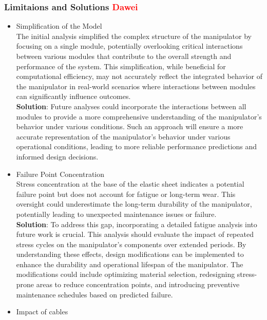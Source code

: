 \subsubsection{Limitaions and Solutions \textcolor{red}{Dawei}}
\begin{itemize}
    \item Simplification of the Model \\
    The initial analysis simplified the complex structure of the manipulator by focusing on a single module, 
    potentially overlooking critical interactions between various modules that contribute to the overall 
    strength and performance of the system. This simplification, while beneficial for computational efficiency, 
    may not accurately reflect the integrated behavior of the manipulator in real-world scenarios where interactions 
    between modules can significantly influence outcomes. \\
    \textbf{Solution}: Future analyses could incorporate the interactions between all modules to provide a more 
    comprehensive understanding of the manipulator's behavior under various conditions. Such an approach will 
    ensure a more accurate representation of the manipulator's behavior under various operational conditions, 
    leading to more reliable performance predictions and informed design decisions. \\
    \item Failure Point Concentration \\
    Stress concentration at the base of the elastic sheet indicates a potential failure point but does not 
    account for fatigue or long-term wear. This oversight could underestimate the long-term durability of 
    the manipulator, potentially leading to unexpected maintenance issues or failure. \\
    \textbf{Solution}: To address this gap, incorporating a detailed fatigue analysis into future work is 
    crucial. This analysis should evaluate the impact of repeated stress cycles on the manipulator's components 
    over extended periods. By understanding these effects, design modifications can be implemented to enhance 
    the durability and operational lifespan of the manipulator. The modifications could include optimizing 
    material selection, redesigning stress-prone areas to reduce concentration points, and introducing preventive 
    maintenance schedules based on predicted failure. \\
    \item Impact of cables \\

\end{itemize}
